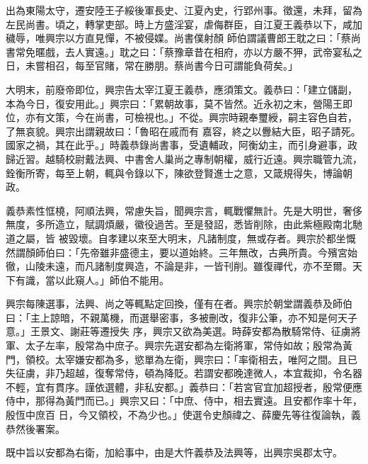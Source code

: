 \begin{pinyinscope}
 出為東陽太守，遷安陸王子綏後軍長史、江夏內史，行郢州事。徵還，未拜，留為左民尚書。頃之，轉掌吏部。時上方盛淫宴，虐侮群臣，自江夏王義恭以下，咸加穢辱，唯興宗以方直見憚，不被侵媟。尚書僕射顏
 師伯謂議曹郎王耽之曰：「蔡尚書常免暱戲，去人實遠。」耽之曰：「蔡豫章昔在相府，亦以方嚴不狎，武帝宴私之日，未嘗相召，每至官賭，常在勝朋。蔡尚書今日可謂能負荷矣。」



 大明末，前廢帝即位，興宗告太宰江夏王義恭，應須策文。義恭曰：「建立儲副，本為今日，復安用此。」興宗曰：「累朝故事，莫不皆然。近永初之末，營陽王即位，亦有文策，今在尚書，可檢視也。」不從。興宗時親奉璽綬，嗣主容色自若，了無哀貌。興宗出謂親故曰：「魯昭在戚而有
 嘉容，終之以釁結大臣，昭子請死。國家之禍，其在此乎。」時義恭錄尚書事，受遺輔政，阿衡幼主，而引身避事，政歸近習。越騎校尉戴法興、中書舍人巢尚之專制朝權，威行近遠。興宗職管九流，銓衡所寄，每至上朝，輒與令錄以下，陳欲登賢進士之意，又箴規得失，博論朝政。



 義恭素性恇橈，阿順法興，常慮失旨，聞興宗言，輒戰懼無計。先是大明世，奢侈無度，多所造立，賦調煩嚴，徽役過苦。至是發詔，悉皆削除，由此紫極殿南北馳道之屬，皆
 被毀壞。自孝建以來至大明末，凡諸制度，無或存者。興宗於都坐慨然謂顏師伯曰：「先帝雖非盛德主，要以道始終。三年無改，古典所貴。今殯宮始徹，山陵未遠，而凡諸制度興造，不論是非，一皆刊削。雖復禪代，亦不至爾。天下有識，當以此窺人。」師伯不能用。



 興宗每陳選事，法興、尚之等輒點定回換，僅有在者。興宗於朝堂謂義恭及師伯曰：「主上諒暗，不親萬機，而選舉密事，多被刪改，復非公筆，亦不知是何天子意。」王景文、謝莊等遷授失
 序，興宗又欲為美選。時薛安都為散騎常侍、征虜將軍、太子左率，殷常為中庶子。興宗先選安都為左衛將軍，常侍如故；殷常為黃門，領校。太宰嫌安都為多，慾單為左衛，興宗曰：「率衛相去，唯阿之間。且已失征虜，非乃超越，復奪常侍，頓為降貶。若謂安都晚達微人，本宜裁抑，令名器不輕，宜有貫序。謹依選體，非私安都。」義恭曰：「若宮官宜加超授者，殷常便應侍中，那得為黃門而已。」興宗又曰：「中庶、侍中，相去實遠。且安都作率十年，殷恆中庶百
 日，今又領校，不為少也。」使選令史顏禕之、薛慶先等往復論執，義恭然後署案。



 既中旨以安都為右衛，加給事中，由是大忤義恭及法興等，出興宗吳郡太守。




\end{pinyinscope}
